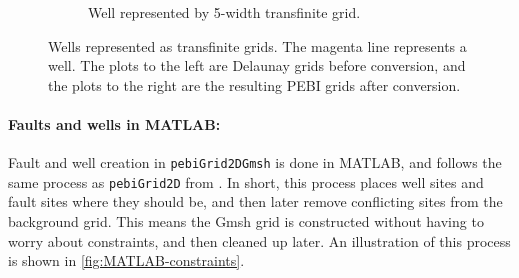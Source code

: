 \begin{figure}[htp]
\begin{subfigure}[b]{\textwidth}
\begin{subfigure}[b]{0.35\textwidth}
        \end{subfigure}
        \caption{Well represented by 5-width transfinite grid.}
        \label{fig:trans-well-2}
    \end{subfigure}
    \caption[Wells represented as transfinite grids.]{Wells represented as transfinite grids. The magenta line represents a well. The plots to the left are Delaunay grids before conversion, and the plots to the right are the resulting PEBI grids after conversion.}
    \label{fig:trans-wells}
\end{figure}


\paragraph{Faults and wells in MATLAB:}
Fault and well creation in \verb|pebiGrid2DGmsh| is done in MATLAB, and follows the same process as \verb|pebiGrid2D| from \textcite{UPR_thesis}. In short, this process places well sites and fault sites where they should be, and then later remove conflicting sites from the background grid. This means the Gmsh grid is constructed without having to worry about constraints, and then cleaned up later. An illustration of this process is shown in \autoref{fig:MATLAB-constraints}.

